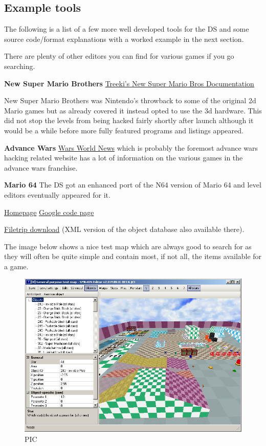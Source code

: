 \documentclass[
]{book}
\begin{document}
\hypertarget{example-tools}{%
\subsection{Example tools}\label{example-tools}}

The following is a list of a few more well developed tools for the DS and some source code/format explanations with a worked example in the next section.

There are plenty of other editors you can find for various games if you go searching.

\textbf{New Super Mario Brothers} \href{http://treeki.rustedlogic.net/romhacking/docs.html}{Treeki's New Super Mario Bros Documentation}

New Super Mario Brothers was Nintendo's throwback to some of the original 2d Mario games but as already covered it instead opted to use the 3d hardware. This did not stop the levels from being hacked fairly shortly after launch although it would be a while before more fully featured programs and listings appeared.

\textbf{Advance Wars} \href{http://www.warsworldnews.com/index.php?page=mapsindex.html}{Wars World News} which is probably the foremost advance wars hacking related website has a lot of information on the various games in the advance wars franchise.

\textbf{Mario 64} The DS got an enhanced port of the N64 version of Mario 64 and level editors eventually appeared for it.

\href{http://kuribo64.cjb.net/downloads.php}{Homepage} \href{http://sm64dse.googlecode.com/svn/trunk/}{Google code page}

\href{http://filetrip.net/nds-downloads/rom-hacks/download-sm64ds-editor-mario-64-ds-20-beta-3-f29354.html}{Filetrip download} (XML version of the object database also available there).

The image below shows a nice test map which are always good to search for as they will often be quite simple and contain most, if not all, the items available for a game.

\begin{figure}
\centering
\includegraphics{images/167_home_fast6191_romhackingguide_unrenamed_fil___nal_borders_romhackguideleveleditingMario64.png}
\caption{PIC}
\end{figure}
\end{document}
